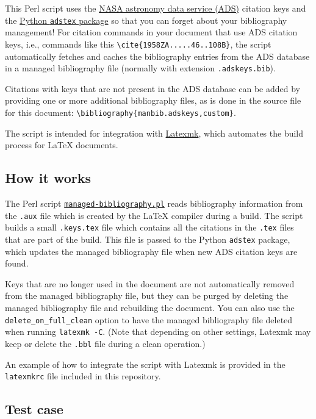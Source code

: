 This Perl script uses the \href{https://ui.adsabs.harvard.edu/}{NASA
astronomy data service (ADS)} citation keys and the
\href{https://github.com/yymao/adstex}{Python \texttt{adstex} package}
so that you can forget about your bibliography management! For citation
commands in your document that use ADS citation keys, i.e., commands
like this \texttt{\textbackslash{}cite\{1958ZA.....46..108B\}}, the
script automatically fetches and caches the bibliography entries from
the ADS database in a managed bibliography file (normally with extension
\texttt{.adskeys.bib}).

Citations with keys that are not present in the ADS database can be
added by providing one or more additional bibliography files, as is done
in the source file for this document:
\texttt{\textbackslash{}bibliography\{manbib.adskeys,custom\}}.

The script is intended for integration with
\href{https://ctan.org/pkg/latexmk/}{Latexmk}, which automates the build
process for LaTeX documents.

\subsection{How it works}\label{how-it-works}

The Perl script
\href{./managed-bibliography.pl}{\texttt{managed-bibliography.pl}} reads
bibliography information from the \texttt{.aux} file which is created by
the LaTeX compiler during a build. The script builds a small
\texttt{.keys.tex} file which contains all the citations in the
\texttt{.tex} files that are part of the build. This file is passed to
the Python \texttt{adstex} package, which updates the managed
bibliography file when new ADS citation keys are found.

Keys that are no longer used in the document are not automatically
removed from the managed bibliography file, but they can be purged by
deleting the managed bibliography file and rebuilding the document. You
can also use the \texttt{delete\_on\_full\_clean} option to have the
managed bibliography file deleted when running \texttt{latexmk\ -C}.
(Note that depending on other settings, Latexmk may keep or delete the
\texttt{.bbl} file during a clean operation.)

An example of how to integrate the script with Latexmk is provided in
the \texttt{latexmkrc} file included in this repository.

\subsection{Test case}\label{test-case}

